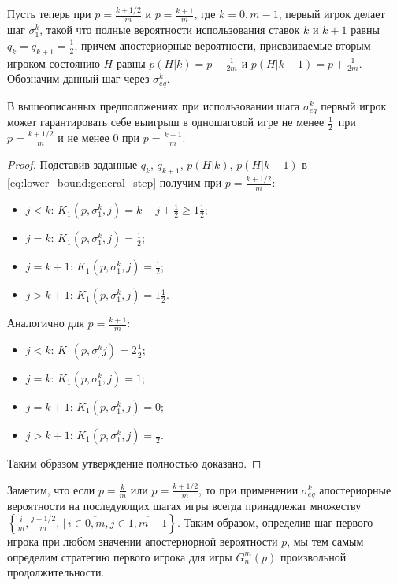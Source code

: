 Пусть теперь при $ p = \frac{k+1/2}{m} $ и $ p = \frac{k+1}{m} $, где $ k = \overline{0, m - 1} $, первый игрок делает шаг $ \sigma^k_1 $, такой что полные вероятности использования ставок $ k $ и $ k + 1 $ равны $ q_k = q_{k+1} = \frac{1}{2} $, причем апостериорные вероятности, присваиваемые вторым игроком состоянию $ H $ равны $ p(H|k) = p - \frac{1}{2m} $ и $ p(H|k+1) = p + \frac{1}{2m} $. 
Обозначим данный шаг через $ \sigma^k_{eq} $.

\begin{prop}
В вышеописанных предположениях при использовании шага $ \sigma^k_{eq} $ первый игрок может гарантировать себе выигрыш в одношаговой игре не менее $ \frac{1}{2} $~при~$ p = \frac{k+1/2}{m} $ и не менее $ 0 $ при $ p = \frac{k+1}{m} $.
\end{prop}
\begin{proof}
    Подставив заданные $ q_k $, $ q_{k+1} $, $ p(H|k) $, $ p(H|{k+1}) $ в \eqref{eq:lower_bound:general_step} получим при $ p = \frac{k + 1/2}{m} $:
    \begin{itemize}
    \item
    $ j < k $: $ K_1(p, \sigma^k_1, j) = k - j + \frac{1}{2} \geq 1\frac{1}{2} $;
    \item
    $ j = k $: $ K_1(p, \sigma^k_1, j) = \frac{1}{2} $;
    \item
    $ j = k + 1 $: $ K_1(p, \sigma^k_1, j) = \frac{1}{2} $;
    \item
    $ j > k + 1 $: $ K_1(p, \sigma^k_1, j) = 1\frac{1}{2} $.
    \end{itemize}
    
    Аналогично для $ p = \frac{k+1}{m} $:
    \begin{itemize}
    \item
    $ j < k $: $ K_1(p, \sigma^k_, j) = 2\frac{1}{2} $;
    \item
    $ j = k $: $ K_1(p, \sigma^k_1, j) = 1 $;
    \item
    $ j = k + 1 $: $ K_1(p, \sigma^k_1, j) = 0 $;
    \item
    $ j > k + 1 $: $ K_1(p, \sigma^k_1, j) = \frac{1}{2} $.
    \end{itemize}
    
    Таким образом утверждение полностью доказано.
\end{proof}

Заметим, что если $ p = \frac{k}{m} $ или $ p = \frac{k+1/2}{m} $, то при применении $ \sigma^k_{eq} $ апостериорные вероятности на последующих шагах игры всегда принадлежат множеству 
$ \left\{
    \frac{i}{m}, \frac{j+1/2}{m}, \,|\, i \in \overline{0,m}, j \in \overline{1,m-1}
\right\} $. 
Таким образом, определив шаг первого игрока при любом значении апостериорной вероятности $ p $, мы тем самым определим стратегию первого игрока для игры $ G_n^m(p) $ произвольной продолжительности.

